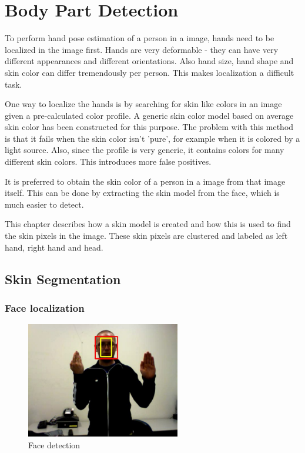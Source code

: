 
\chapter{Body Part Detection}
\label{ch:bodyparts}

To perform hand pose estimation of a person in a image, hands need to be localized in the image first. Hands are very deformable - they can have very different appearances and different orientations. Also hand size, hand shape and skin color can differ tremendously per person. This makes localization a  difficult task. 

One way to localize the hands is by searching for skin like colors in an image given a pre-calculated color profile. A generic skin color model based on average skin color has been constructed for this purpose\cite{Jones1999}. The problem with this method is that it fails when the skin color isn't 'pure', for example when it is colored by a light source. Also, since the profile is very generic, it contains colors for many different skin colors. This introduces more false positives.

It is preferred to obtain the skin color of a person in a image from that image itself. This can be done by extracting the skin model from the face, which is much easier to detect.

This chapter describes how a skin model is created and how this is used to find the skin pixels in the image. These  skin pixels are clustered and labeled as left hand, right hand and head. 

\section{Skin Segmentation}
\label{sec:skinmodel}

\subsection*{Face localization}

\begin{figure}
  \center{}
    \includegraphics[width=0.6\textwidth]{figures/pipeline/detected.jpg}
  \caption{Face detection}
  \label{fig:face_detection}
\end{figure}

